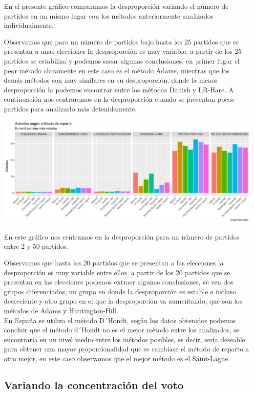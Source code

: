 \documentclass[12pt,a4paper,]{book}
\numberwithin{dummy}{section}
\theoremstyle{ocrenumbox}
\theoremstyle{blacknumex}
\theoremstyle{blacknumbox}
\theoremstyle{ocrenum}
\theoremstyle{ocrenum}
\begin{document}
En el presente gráfico comparamos la desproporción variando el número de
partidos en un mismo lugar con los métodos anteriormente analizados
individualmente.

Observamos que para un número de partidos bajo hasta los 25 partidos que
se presentan a unas elecciones la desproporción es muy variable, a
partir de los 25 partidos se estabiliza y podemos sacar algunas
conclusiones, en primer lugar el peor método claramente en este caso es
el método Adams, mientras que los demás métodos son muy similares en su
desproporción, donde la menor desproporción la podemos encontrar entre
los métodos Danish y LR-Hare. A continuación nos centraremos en la
desproporción cuando se presentan pocos partidos para analizarlo más
detenidamente.

\begin{center}\includegraphics[width=0.95\linewidth]{figurasR/unnamed-chunk-64-1} \end{center}

En este gráfico nos centramos en la desproporción para un número de
partidos entre 2 y 50 partidos.

Observamos que hasta los 20 partidos que se presentan a las elecciones
la desproporción es muy variable entre ellos, a partir de los 20
partidos que se presentan en las elecciones podemos extraer algunas
conclusiones, se ven dos grupos diferenciados, un grupo en donde la
desproporción es estable e incluso decreciente y otro grupo en el que la
desproporción va aumentando, que son los métodos de Adams y
Huntington-Hill.\\
En España se utiliza el método D´Hondt, según los datos obtenidos
podemos concluir que el método d´Hondt no es el mejor método entre los
analizados, se encontraría en un nivel medio entre los métodos posibles,
es decir, sería deseable para obtener una mayor proporcionalidad que se
cambiase el método de reparto a otro mejor, en este caso observamos que
el mejor método es el Saint-Lague.

\hypertarget{variando-la-concentraciuxf3n-del-voto}{%
\subsection{Variando la concentración del
voto}\label{variando-la-concentraciuxf3n-del-voto}}
\end{document}
